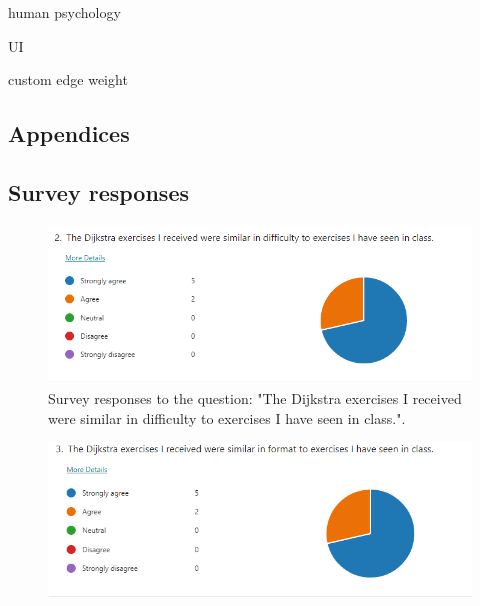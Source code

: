 \documentclass{l4proj}
\begin{document}
human psychology

UI

custom edge weight 

%
% 

\begin{appendices}

\chapter{Appendices}
\label{chap:appendices}

\section{Survey responses}
\label{sec:survey_responses}
\begin{figure}[h]
    \centering
    \includegraphics[width=0.9\linewidth]{images/d_similar_difficulty.png}    

    \caption{Survey responses to the question: "The Dijkstra exercises I received were similar in difficulty to exercises I have seen in class.".}
    \label{fig:d_similar_difficulty} 
\end{figure}

\begin{figure}[h]
    \centering
    \includegraphics[width=0.9\linewidth]{images/d_similar_format.png}    


\end{figure}
\end{appendices}
\end{document}
